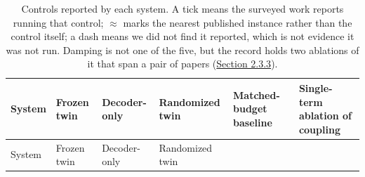 \documentclass[a4paper,fleqn]{cas-sc}
\begin{document}
\begin{longtable}[]{@{}
  >{\raggedright\arraybackslash}p{}
  >{\raggedright\arraybackslash}p{}
  >{\raggedright\arraybackslash}p{}
  >{\raggedright\arraybackslash}p{}
  >{\raggedright\arraybackslash}p{}
  >{\raggedright\arraybackslash}p{}@{}}
\caption{Controls reported by each system. A tick means the surveyed
work reports running that control; \ensuremath{\approx} marks the
nearest published instance rather than the control itself; a dash means
we did not find it reported, which is not evidence it was not run.
Damping is not one of the five, but the record holds two ablations of it
that span a pair of papers (\hyperref[sec-2-3-3]{Section
2.3.3}).}\tabularnewline
\toprule\noalign{}
\begin{minipage}[b]{\linewidth}\raggedright
System
\end{minipage} & \begin{minipage}[b]{\linewidth}\raggedright
Frozen twin
\end{minipage} & \begin{minipage}[b]{\linewidth}\raggedright
Decoder-only
\end{minipage} & \begin{minipage}[b]{\linewidth}\raggedright
Randomized twin
\end{minipage} & \begin{minipage}[b]{\linewidth}\raggedright
Matched-budget baseline
\end{minipage} & \begin{minipage}[b]{\linewidth}\raggedright
Single-term ablation of coupling
\end{minipage} \\
\midrule\noalign{}
\endfirsthead
\toprule\noalign{}
\begin{minipage}[b]{\linewidth}\raggedright
System
\end{minipage} & \begin{minipage}[b]{\linewidth}\raggedright
Frozen twin
\end{minipage} & \begin{minipage}[b]{\linewidth}\raggedright
Decoder-only
\end{minipage} & \begin{minipage}[b]{\linewidth}\raggedright
Randomized twin
\end{minipage} & \begin{minipage}[b]{\linewidth}\raggedright

\end{minipage}
\end{longtable}
\end{document}
